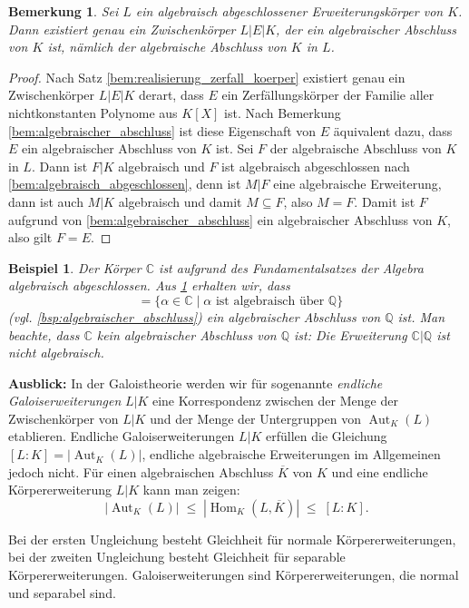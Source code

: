 \documentclass[a4paper, twoside, 11pt, ngerman]{report}
\newcommand{\CC}{\mathds C}
\newcommand{\QQ}{\mathds Q}
\DeclareMathOperator{\alg}{alg}
\DeclareMathOperator{\Aut}{Aut}
\DeclareMathOperator{\Hom}{Hom}
\DeclareMathOperator{\QQalg}{\QQ^{\alg}}
\theoremstyle{definistyle}
\newtheorem{bem}[satz]{Bemerkung}
\newtheorem{bsp}[satz]{Beispiel}
\theoremstyle{remark}
\begin{document}
\begin{bem}\label{bem:einbettung_alg_abschluss}
Sei $L$ ein algebraisch abgeschlossener Erweiterungskörper von $K$. Dann existiert genau ein Zwischenkörper $L|E|K$, der ein algebraischer Abschluss von $K$ ist, nämlich der algebraische Abschluss von $K$ in $L$.
\end{bem}

\begin{proof}
Nach Satz \ref{bem:realisierung_zerfall_koerper} existiert genau ein Zwischenkörper $L|E|K$ derart, dass $E$ ein Zerfällungskörper der Familie aller nichtkonstanten Polynome aus $K[X]$ ist. Nach Bemerkung \ref{bem:algebraischer_abschluss} ist diese Eigenschaft von $E$ äquivalent dazu, dass $E$ ein algebraischer Abschluss von $K$ ist. 
Sei $F$ der algebraische Abschluss von $K$ in $L$. Dann ist $F|K$ algebraisch und $F$ ist algebraisch abgeschlossen nach \ref{bem:algebraisch_abgeschlossen}, denn ist $M|F$
eine algebraische Erweiterung, dann ist auch $M|K$ algebraisch und damit $M\subseteq F$,
also $M=F$. Damit ist $F$ aufgrund von \ref{bem:algebraischer_abschluss} ein algebraischer Abschluss von $K$, also gilt $F=E$.
\end{proof}

\begin{bsp}\label{bsp:kp_alg_zahlen_in_C}
Der Körper $\mathbb{C}$ ist aufgrund des Fundamentalsatzes der Algebra algebraisch abgeschlossen. Aus \ref{bem:einbettung_alg_abschluss} erhalten wir, dass   
\[\QQalg = \{\alpha \in \mathbb{C} \mid \alpha \text{ ist algebraisch über } \QQ\}\] (vgl. \ref{bsp:algebraischer_abschluss}) ein algebraischer Abschluss von $\QQ$ ist. Man beachte, dass $\CC$
kein algebraischer Abschluss von $\QQ$ ist: Die Erweiterung $\CC|\QQ$ ist nicht algebraisch.
\end{bsp}

\noindent\textbf{Ausblick:} In der Galoistheorie werden wir für sogenannte \emph{endliche Galoiserweiterungen} $L|K$ eine Korrespondenz zwischen der Menge der Zwischenkörper von $L|K$ und der Menge der Untergruppen von $\Aut_K(L)$ etablieren. Endliche Galoiserweiterungen $L|K$ erfüllen die Gleichung $[L:K] = |\Aut_K(L)|$, endliche algebraische Erweiterungen im Allgemeinen jedoch nicht.
Für einen algebraischen Abschluss $\overline{K}$ von $K$ und eine endliche Körpererweiterung $L|K$ kann man zeigen:
\[
|\Aut_K(L)| \; \leq \; |\Hom_K(L,\overline{K})| \; \leq \; [L:K].
\]

Bei der ersten Ungleichung besteht Gleichheit für normale Körpererweiterungen,
bei der zweiten Ungleichung besteht Gleichheit für separable Körpererweiterungen. Galoiserweiterungen sind Körpererweiterungen, die normal und separabel sind.
\end{document}
